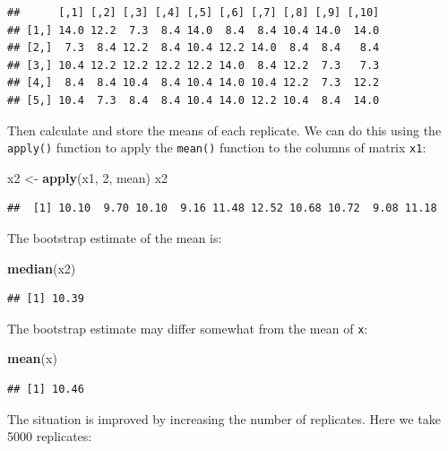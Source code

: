 \documentclass[12pt,a4paper]{book}
\newenvironment{Shaded}{\begin{snugshade}}{\end{snugshade}}
\newcommand{\KeywordTok}[1]{\textcolor[rgb]{0.13,0.29,0.53}{\textbf{#1}}}
\newcommand{\DecValTok}[1]{\textcolor[rgb]{0.00,0.00,0.81}{#1}}
\newcommand{\StringTok}[1]{\textcolor[rgb]{0.31,0.60,0.02}{#1}}
\newcommand{\NormalTok}[1]{#1}
\theoremstyle{definition}
\theoremstyle{definition}
\theoremstyle{definition}
\theoremstyle{remark}
\begin{document}
\begin{verbatim}
##      [,1] [,2] [,3] [,4] [,5] [,6] [,7] [,8] [,9] [,10]
## [1,] 14.0 12.2  7.3  8.4 14.0  8.4  8.4 10.4 14.0  14.0
## [2,]  7.3  8.4 12.2  8.4 10.4 12.2 14.0  8.4  8.4   8.4
## [3,] 10.4 12.2 12.2 12.2 12.2 14.0  8.4 12.2  7.3   7.3
## [4,]  8.4  8.4 10.4  8.4 10.4 14.0 10.4 12.2  7.3  12.2
## [5,] 10.4  7.3  8.4  8.4 10.4 14.0 12.2 10.4  8.4  14.0
\end{verbatim}

Then calculate and store the means of each replicate. We can do this
using the \texttt{apply()} function to apply the \texttt{mean()}
function to the columns of matrix \texttt{x1}:

\begin{Shaded}
\begin{Highlighting}[]
\NormalTok{x2 <-}\StringTok{ }\KeywordTok{apply}\NormalTok{(x1, }\DecValTok{2}\NormalTok{, mean)}
\NormalTok{x2}
\end{Highlighting}
\end{Shaded}

\begin{verbatim}
##  [1] 10.10  9.70 10.10  9.16 11.48 12.52 10.68 10.72  9.08 11.18
\end{verbatim}

The bootstrap estimate of the mean is:

\begin{Shaded}
\begin{Highlighting}[]
\KeywordTok{median}\NormalTok{(x2)}
\end{Highlighting}
\end{Shaded}

\begin{verbatim}
## [1] 10.39
\end{verbatim}

The bootstrap estimate may differ somewhat from the mean of \texttt{x}:

\begin{Shaded}
\begin{Highlighting}[]
\KeywordTok{mean}\NormalTok{(x)}
\end{Highlighting}
\end{Shaded}

\begin{verbatim}
## [1] 10.46
\end{verbatim}

The situation is improved by increasing the number of replicates. Here
we take 5000 replicates:
\end{document}
